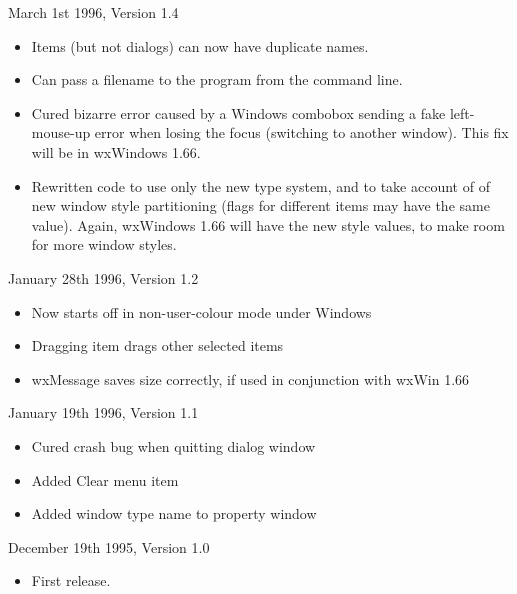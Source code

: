 March 1st 1996, Version 1.4

\begin{itemize}\itemsep=0pt
\item Items (but not dialogs) can now have duplicate names.
\item Can pass a filename to the program from the command line.
\item Cured bizarre error caused by a Windows combobox sending
a fake left-mouse-up error when losing the focus (switching to another
window). This fix will be in wxWindows 1.66.
\item Rewritten code to use only the new type system, and to take account of
of new window style partitioning (flags for different items may have the same value).
Again, wxWindows 1.66 will have the new style values, to make room for more window
styles.
\end{itemize}

January 28th 1996, Version 1.2

\begin{itemize}\itemsep=0pt
\item Now starts off in non-user-colour mode under Windows
\item Dragging item drags other selected items
\item wxMessage saves size correctly, if used in conjunction with wxWin 1.66
\end{itemize}

January 19th 1996, Version 1.1

\begin{itemize}\itemsep=0pt
\item Cured crash bug when quitting dialog window
\item Added Clear menu item
\item Added window type name to property window
\end{itemize}

December 19th 1995, Version 1.0

\begin{itemize}\itemsep=0pt
\item First release.
\end{itemize}

